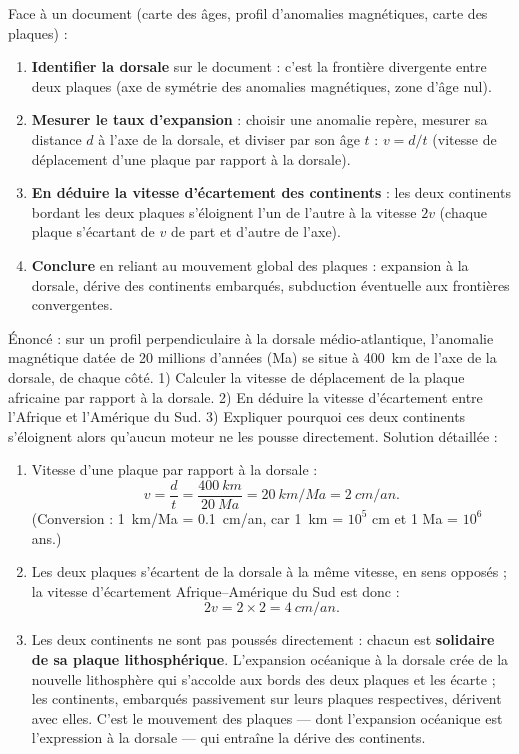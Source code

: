 \documentclass[11pt]{article}
\begin{document}
\begin{methode}
Face à un document (carte des âges, profil d'anomalies magnétiques, carte des plaques) :
\begin{enumerate}
\item \textbf{Identifier la dorsale} sur le document : c'est la frontière divergente entre deux plaques (axe de symétrie des anomalies magnétiques, zone d'âge nul).
\item \textbf{Mesurer le taux d'expansion} : choisir une anomalie repère, mesurer sa distance $d$ à l'axe de la dorsale, et diviser par son âge $t$ : $v = d/t$ (vitesse de déplacement d'une plaque par rapport à la dorsale).
\item \textbf{En déduire la vitesse d'écartement des continents} : les deux continents bordant les deux plaques s'éloignent l'un de l'autre à la vitesse $2v$ (chaque plaque s'écartant de $v$ de part et d'autre de l'axe).
\item \textbf{Conclure} en reliant au mouvement global des plaques : expansion à la dorsale, dérive des continents embarqués, subduction éventuelle aux frontières convergentes.
\end{enumerate}
\end{methode}

\begin{exoresolu}
Énoncé : sur un profil perpendiculaire à la dorsale médio-atlantique, l'anomalie magnétique datée de 20 millions d'années (Ma) se situe à \SI{400}{km} de l'axe de la dorsale, de chaque côté. 1) Calculer la vitesse de déplacement de la plaque africaine par rapport à la dorsale. 2) En déduire la vitesse d'écartement entre l'Afrique et l'Amérique du Sud. 3) Expliquer pourquoi ces deux continents s'éloignent alors qu'aucun moteur ne les pousse directement.
\tcblower
Solution détaillée :
\begin{enumerate}
\item Vitesse d'une plaque par rapport à la dorsale :
\[ v = \frac{d}{t} = \frac{\SI{400}{km}}{\SI{20}{Ma}} = \SI{20}{km/Ma} = \SI{2}{cm/an}. \]
(Conversion : \SI{1}{km/Ma} = \SI{0,1}{cm/an}, car \SI{1}{km} = $10^5$ cm et 1 Ma = $10^6$ ans.)
\item Les deux plaques s'écartent de la dorsale à la même vitesse, en sens opposés ; la vitesse d'écartement Afrique--Amérique du Sud est donc :
\[ 2v = 2 \times 2 = \SI{4}{cm/an}. \]
\item Les deux continents ne sont pas poussés directement : chacun est \textbf{solidaire de sa plaque lithosphérique}. L'expansion océanique à la dorsale crée de la nouvelle lithosphère qui s'accolde aux bords des deux plaques et les écarte ; les continents, embarqués passivement sur leurs plaques respectives, dérivent avec elles. C'est le mouvement des plaques — dont l'expansion océanique est l'expression à la dorsale — qui entraîne la dérive des continents.
\end{enumerate}
\end{exoresolu}
\end{document}

